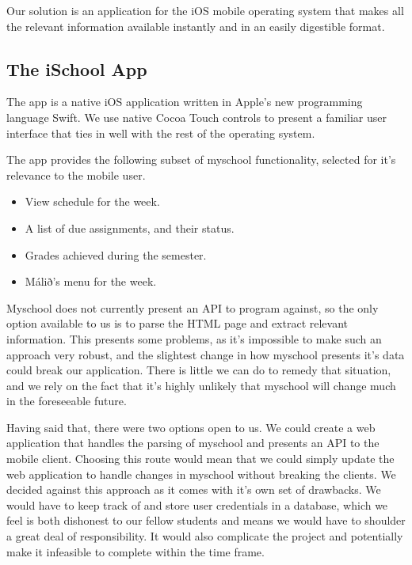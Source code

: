 \documentclass[pdftex, DIV=calc, paper=a4, fontsize=11pt, twocolumn]{scrartcl}	 %
\begin{document}
Our solution is an application for the iOS mobile operating system that makes all the relevant 
information available instantly and in an easily digestible format.


\subsection*{The iSchool App}

The app is a native iOS application written in Apple's new programming language Swift.
We use native Cocoa Touch controls to present a familiar user interface that ties in well with
the rest of the operating system.

The app provides the following subset of myschool functionality, selected for it's relevance to
the mobile user.
\begin{itemize}
    \item View schedule for the week.
    \item A list of due assignments, and their status.
    \item Grades achieved during the semester.
    \item Málið's menu for the week.
\end{itemize}

Myschool does not currently present an API to program against, so the only option available to us
is to parse the HTML page and extract relevant information. This presents some problems, as it's 
impossible to make such an approach very robust, and the slightest change in how myschool presents
it's data could break our application. There is little we can do to remedy that situation, and we
rely on the fact that it's highly unlikely that myschool will change much in the foreseeable future.

Having said that, there were two options open to us. We could create a web application that handles
the parsing of myschool and presents an API to the mobile client. Choosing this route would mean that
we could simply update the web application to handle changes in myschool without breaking the 
clients. We decided against this approach as it comes with it's own set of drawbacks. We would have
to keep track of and store user credentials in a database, which we feel is both dishonest to our
fellow students and means we would have to shoulder a great deal of responsibility. It would also 
complicate the project and potentially make it infeasible to complete within the time frame.
\end{document}
